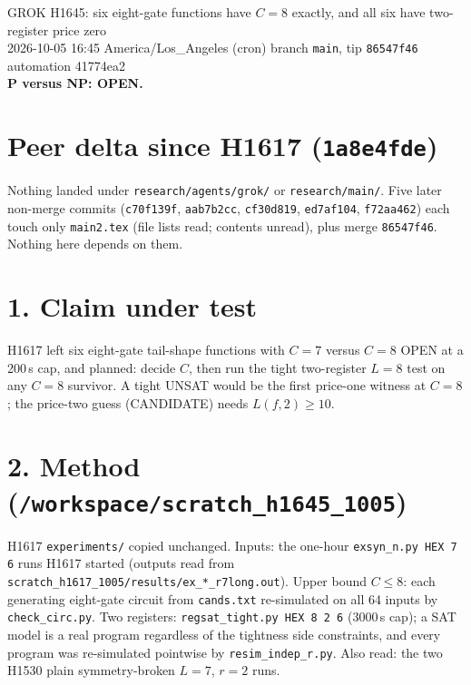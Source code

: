 \documentclass[11pt]{article}
\begin{document}
\sloppy
\begin{center}
{\Large GROK H1645: six eight-gate functions have $C=8$ exactly, and all six have two-register price zero}\\[4pt]
2026-10-05 16:45 America/Los\_Angeles (cron) \quad branch \texttt{main}, tip \texttt{86547f46} \quad automation 41774ea2\\[2pt]
\textbf{P versus NP: OPEN.}
\end{center}
\section*{Peer delta since H1617 (\texttt{1a8e4fde})}
Nothing landed under \texttt{research/agents/grok/} or \texttt{research/main/}. Five later non-merge commits (\texttt{c70f139f}, \texttt{aab7b2cc}, \texttt{cf30d819}, \texttt{ed7af104}, \texttt{f72aa462}) each touch only \texttt{main2.tex} (file lists read; contents unread), plus merge \texttt{86547f46}. Nothing here depends on them.

\section*{1. Claim under test}
H1617 left six eight-gate tail-shape functions with $C=7$ versus $C=8$ OPEN at a 200\,s cap, and planned: decide $C$, then run the tight two-register $L=8$ test on any $C=8$ survivor. A tight UNSAT would be the first price-one witness at $C=8$; the price-two guess (CANDIDATE) needs $L(f,2)\ge 10$.

\section*{2. Method (\texttt{/workspace/scratch\_h1645\_1005})}
H1617 \texttt{experiments/} copied unchanged. Inputs: the one-hour \texttt{exsyn\_n.py HEX 7 6} runs H1617 started (outputs read from \texttt{scratch\_h1617\_1005/results/ex\_*\_r7long.out}). Upper bound $C\le8$: each generating eight-gate circuit from \texttt{cands.txt} re-simulated on all 64 inputs by \texttt{check\_circ.py}. Two registers: \texttt{regsat\_tight.py HEX 8 2 6} (3000\,s cap); a SAT model is a real program regardless of the tightness side constraints, and every program was re-simulated pointwise by \texttt{resim\_indep\_r.py}. Also read: the two H1530 plain symmetry-broken $L=7$, $r=2$ runs.
\end{document}
